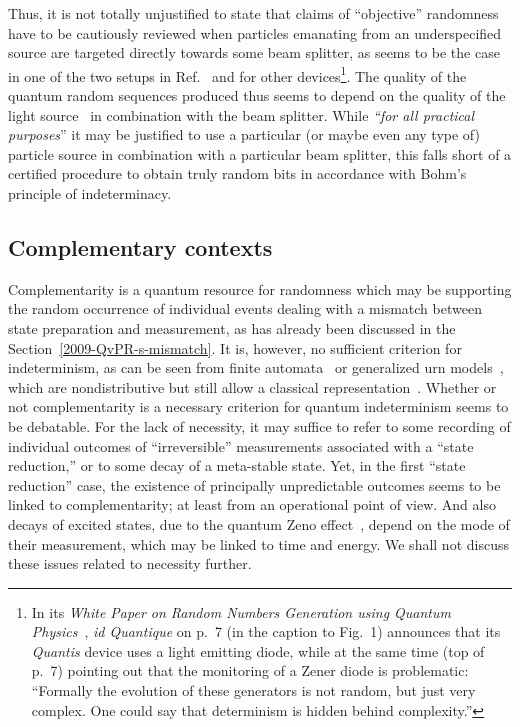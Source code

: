 \documentclass[10pt]{article}%
\begin{document}
Thus, it is not totally unjustified to state that claims of ``objective'' randomness
have to be cautiously reviewed
when particles emanating from an underspecified source are targeted directly towards some beam splitter,
as seems to be the case in one of the two setups in Ref.~\cite[Fig.~1(a)]{zeilinger:qct}
and for other devices\footnote{In its {\em White Paper on Random Numbers Generation
using Quantum Physics}~\cite{Quantis}, {\em id Quantique} on p.~7 (in the caption to Fig.~1) announces that
its {\em Quantis} device  uses a light emitting diode,
while at the same time (top of p.~7) pointing out that the monitoring of a Zener diode is problematic:
``Formally the evolution of these generators is not random, but just very complex. One
could say that determinism is hidden behind complexity.''
}.
The quality of the quantum random
sequences produced thus seems to depend on the quality of the light source~\cite{stefanov-2000}
in combination with the beam splitter.
While {\em ``for all practical purposes}''
it may be justified to use a particular (or maybe even any type of) particle source
in combination with a particular beam splitter, this
falls short of a certified procedure to obtain truly random bits
in accordance with Bohm's principle of indeterminacy.


\subsection{Complementary contexts}

Complementarity is a quantum resource for randomness
which may be supporting the random occurrence of individual events
dealing with a mismatch between state preparation and measurement,
as has already been discussed in the Section~\ref{2009-QvPR-s-mismatch}.
It is, however, no sufficient criterion for indeterminism, as can be seen from finite automata~\cite{e-f-moore} or generalized
urn models~\cite{wright}, which are nondistributive but still allow a classical representation~\cite{svozil-2001-eua,svozil-2005-ln1e}.
Whether or not complementarity is a necessary criterion for quantum indeterminism seems to be debatable.
For the lack of necessity, it may suffice to refer to some recording of individual outcomes of
``irreversible'' measurements associated with a ``state reduction,''
or to some decay of a meta-stable state.
Yet, in the first ``state reduction'' case, the existence of principally unpredictable outcomes
seems to be linked to complementarity; at least from an operational point of view.
And also decays of excited states, due to the quantum Zeno effect~\cite{misra:756},
depend on the mode of their measurement, which may be linked to time and energy.
We shall not discuss these issues related to necessity further.
\end{document}
